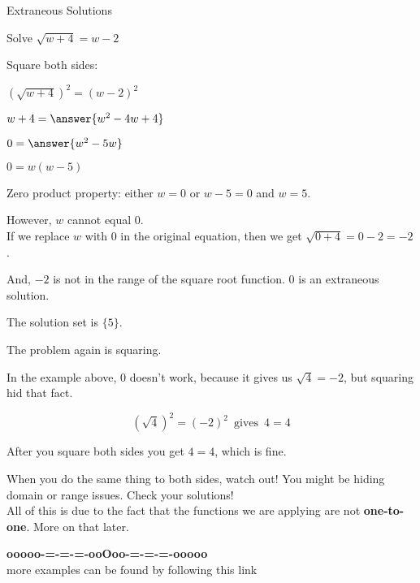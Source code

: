 \documentclass{ximera}
\begin{document}
\begin{example} Extraneous Solutions

Solve $\sqrt{w+4} = w - 2$


\begin{explanation}

Square both sides:



$(\sqrt{w+4})^2 = (w - 2)^2$


$w + 4 = \answer{w^2 - 4w + 4}$


$0 = \answer{w^2 - 5w}$

$0 = w(w-5) $


Zero product property:  either $w=0$ or $w-5=0$ and $w=5$.



However, $w$ cannot equal $0$.  \\

If we replace $w$ with $0$ in the original equation, then we get $\sqrt{0+4} = 0 - 2 = -2$.

And, $-2$ is not in the range of the square root function. $0$ is an extraneous solution.

The solution set is $\{ 5 \}$.

\end{explanation}

\end{example}


The problem again is squaring.

In the example above, $0$ doesn't work, because it gives us $\sqrt{4} = -2$, but squaring hid that fact.  


\[ (\sqrt{4})^2 = (-2)^2 \, \text{ gives } \, 4 = 4\]


After you square both sides you get $4 = 4$, which is fine.





When you do the same thing to both sides, watch out!  You might be hiding domain or range issues.  Check your solutions! \\




All of this is due to the fact that the functions we are applying are not \textbf{one-to-one}.  More on that later.















\begin{center}
\textbf{\textcolor{green!50!black}{ooooo-=-=-=-ooOoo-=-=-=-ooooo}} \\

more examples can be found by following this link\\ 

\end{center}
\end{document}

